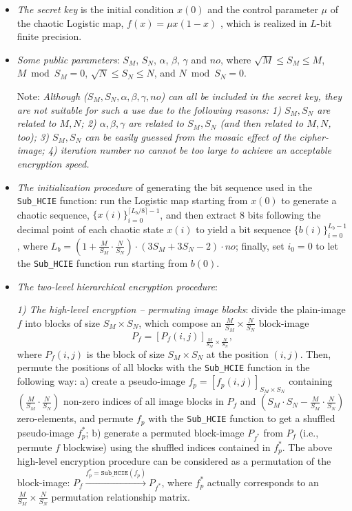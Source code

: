 \documentclass[final,3p,times,twocolumn]{elsarticle}
\begin{document}
\begin{itemize}
\item \textit{The secret key} is the initial condition $x(0)$ and
the control parameter $\mu$ of the chaotic Logistic map, $f(x)=\mu
x(1-x)$ \cite{Devaney:Chaos:2003}, which is realized in $L$-bit finite precision.

\item \textit{Some public parameters}: $S_M$, $S_N$, $\alpha$,
$\beta$, $\gamma$ and $no$, where $\sqrt{M}\leq S_M \leq M$,
$M\bmod S_M=0$, $\sqrt{N}\leq S_N\leq N$, and $N\bmod S_N=0$.

Note: {\it Although ($S_M,S_N,\alpha,\beta,\gamma,no$) can all be
included in the secret key, they are not suitable for such a use
due to the following reasons: 1) $S_M,S_N$ are related to $M,N$;
2) $\alpha,\beta,\gamma$ are related to $S_M,S_N$ (and then
related to $M,N$, too); 3) $S_M,S_N$ can be easily guessed from
the mosaic effect of the cipher-image; 4) iteration number $no$ cannot be too large
to achieve an acceptable encryption speed.}

\item \textit{The initialization procedure} of generating the bit
sequence used in the \texttt{Sub\_HCIE} function: run the Logistic
map starting from $x(0)$ to generate a chaotic sequence,
$\{x(i)\}_{i=0}^{\lceil L_b/8\rceil-1}$, and then extract 8
bits following the decimal point of each chaotic state $x(i)$ to
yield a bit sequence $\{b(i)\}_{i=0}^{L_b-1}$, where
$L_b=\left(1+\frac{M}{S_M}\cdot\frac{N}{S_N}\right)\cdot(3S_M+3S_N-2)\cdot
no$; finally, set $i_0=0$ to let the \texttt{Sub\_HCIE} function
run starting from $b(0)$.

\item \textit{The two-level hierarchical encryption procedure}:

\textit{1) The high-level encryption -- permuting image
blocks}: divide the plain-image $f$ into blocks of size $S_M\times
S_N$, which compose an $\frac{M}{S_M}\times\frac{N}{S_N}$
block-image
\[P_f=\left[P_f(i,j)\right]_{\frac{M}{S_M}\times\frac{N}{S_N}},\]
where $P_f(i,j)$ is the block of size $S_M\times S_N$ at the
position $(i,j)$. Then, permute the positions of all blocks with
the \texttt{Sub\_HCIE} function in the following way:
a) create a pseudo-image $f_p=[f_p(i,j)]_{S_M\times S_N}$
containing $\left(\frac{M}{S_M}\cdot\frac{N}{S_N}\right)$ non-zero
indices of all image blocks in $P_f$ and $\left(S_M\cdot
S_N-\frac{M}{S_M}\cdot\frac{N}{S_N}\right)$ zero-elements, and
permute $f_p$ with the \texttt{Sub\_HCIE} function to get a
shuffled pseudo-image $f_p^*$; b) generate a permuted block-image $P_{f^*}$ from $P_f$ (i.e.,
permute $f$ blockwise) using the shuffled indices contained in
$f_p^*$.
The above high-level encryption procedure can be considered as a
permutation of the block-image:
$P_f\xrightarrow{f_p^*=\mathtt{Sub\_HCIE}(f_p)}P_{f^*}$, where
$f_p^*$ actually corresponds to an
$\frac{M}{S_M}\times\frac{N}{S_N}$ permutation relationship matrix.


\end{itemize}
\end{document}
